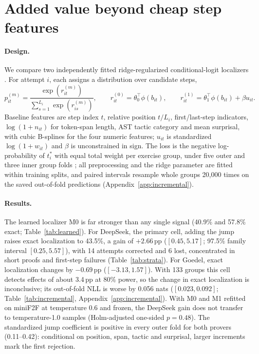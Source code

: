 \section{Added value beyond cheap step features}\label{sec:learned}

\paragraph{Design.} We compare two independently fitted ridge-regularized conditional-logit localizers \citep{mcfadden1974}. For attempt $i$, each assigns a distribution over candidate steps,
\begin{equation}\label{eq:clogit}
p_{it}^{(m)}=\frac{\exp(r_{it}^{(m)})}{\sum_{s=1}^{L_i}\exp(r_{is}^{(m)})},\qquad r_{it}^{(0)}=\theta_0^\top\phi(b_{it}),\qquad r_{it}^{(1)}=\theta_1^\top\phi(b_{it})+\beta u_{it}.
\end{equation}
Baseline features are step index $t$, relative position $t/L_i$, first/last-step indicators, $\log(1+n_{it})$ for token-span length, AST tactic category and mean surprisal, with cubic B-splines for the four numeric features; $u_{it}$ is standardized $\log(1+w_{it})$ and $\beta$ is unconstrained in sign. The loss is the negative log-probability of $t_i^*$ with equal total weight per exercise group, under five outer and three inner group folds \citep{varma2006}; all preprocessing and the ridge parameter are fitted within training splits, and paired intervals resample whole groups 20,000 times on the saved out-of-fold predictions (Appendix~\ref{app:incremental}).


\paragraph{Results.} The learned localizer M0 is far stronger than any single signal (40.9\% and 57.8\% exact; Table~\ref{tab:learned}). For DeepSeek, the primary cell, adding the jump raises exact localization to 43.5\%, a gain of $+2.66$\,pp ($[0.45, 5.17]$; 97.5\% family interval $[0.25, 5.57]$), with 14 attempts corrected and 6 lost, concentrated in short proofs and first-step failures (Table~\ref{tab:strata}). For Goedel, exact localization changes by $-0.69$\,pp ($[-3.13, 1.57]$). With 133 groups this cell detects effects of about 3.4\,pp at 80\% power, so the change in exact localization is inconclusive; its out-of-fold NLL is worse by 0.056 nats ($[0.023, 0.092]$; Table~\ref{tab:incremental}, Appendix~\ref{app:incremental}). With M0 and M1 refitted on miniF2F at temperature 0.6 and frozen, the DeepSeek gain does not transfer to temperature-1.0 samples (Holm-adjusted one-sided $p=0.48$). The standardized jump coefficient is positive in every outer fold for both provers (0.11--0.42): conditional on position, span, tactic and surprisal, larger increments mark the first rejection.

